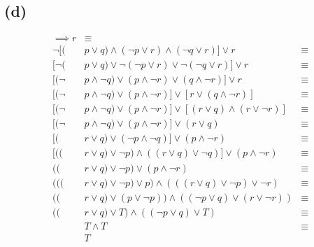 \documentclass{article}
\begin{document}
\subsection{(d)}
\begin{align*}
	[(      & p \lor q) \land (p \implies r) \land (q \implies r)] \implies r                & \equiv \\
	\neg [( & p \lor q) \land (\neg p \lor r) \land (\neg q \lor r)] \lor r                  & \equiv \\
	[\neg ( & p \lor q) \lor \neg (\neg p \lor r) \lor \neg (\neg q \lor r)] \lor r          & \equiv \\
	[(\neg  & p \land \neg q) \lor (p \land \neg r) \lor (q \land \neg r)] \lor r            & \equiv \\
	[(\neg  & p \land \neg q) \lor (p \land \neg r)] \lor [r \lor (q \land \neg r)]          & \equiv \\
	[(\neg  & p \land \neg q) \lor (p \land \neg r)] \lor [(r \lor q) \land (r \lor \neg r)] & \equiv \\
	[(\neg  & p \land \neg q) \lor (p \land \neg r)] \lor (r \lor q)                         & \equiv \\
	[(      & r \lor q) \lor (\neg p \land \neg q)] \lor (p \land \neg r)                    & \equiv \\
	[((     & r \lor q) \lor \neg p) \land ((r \lor q) \lor \neg q)] \lor (p \land \neg r)   & \equiv \\
	((      & r \lor q) \lor \neg p) \lor (p \land \neg r)                                   & \equiv \\
	(((     & r \lor q) \lor \neg p) \lor p) \land (((r \lor q) \lor \neg p) \lor \neg r)    & \equiv \\
	((      & r \lor q) \lor (p \lor \neg p)) \land ((\neg p \lor q) \lor (r \lor \neg r))   & \equiv \\
	((      & r \lor q) \lor T) \land ((\neg p \lor q) \lor T)                               & \equiv \\
	        & T \land T                                                                      & \equiv \\
	        & T
\end{align*}
\end{document}
